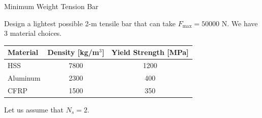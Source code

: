 \documentclass[
10pt,
a4paper,
openany,
svgnames,
]{book}
\begin{document}
\begin{example} Minimum Weight Tension Bar
  
  Design a lightest possible 2-m tensile bar that can take $F_{\max} = 50000 \text{ N}$. We have 3 material choices.
  
  \begin{center}
    \begin{tabular}[H]{lcc}
      \toprule
      Material & Density [kg/m$^3$] & Yield Strength [MPa] \\
      \midrule
      HSS      & 7800 & 1200 \\
      Aluminum & 2300 & 400 \\
      CFRP     & 1500 & 350 \\
      \bottomrule
    \end{tabular}
  \end{center}
  
  Let us assume that $N_s = 2$.
\end{example}
\end{document}
